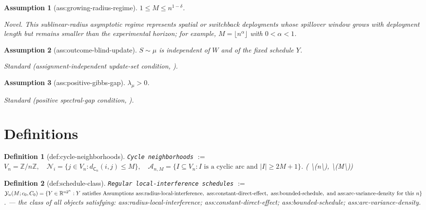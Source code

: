 \documentclass{article}
\newtheorem{assumption}{Assumption}
\newtheorem{definition}{Definition}
\begin{document}
\begin{assumption}[ass:growing-radius-regime]\label{ass:growing-radius-regime}
\(1\le M\le n^{1-\delta}\).
\par\smallskip\noindent\emph{Novel.} This sublinear-radius asymptotic regime represents spatial or switchback deployments whose spillover window grows with deployment length but remains smaller than the experimental horizon; for example, \(M=\lfloor n^\alpha\rfloor\) with \(0<\alpha<1\).
\end{assumption}

\begin{assumption}[ass:outcome-blind-update]\label{ass:outcome-blind-update}
\(S\sim\mu\) is independent of \(W\) and of the fixed schedule \(Y\).
\par\smallskip\noindent\emph{Standard} (assignment-independent update-set condition, \cite{ParkWager2026NeymanJackknife}).
\end{assumption}

\begin{assumption}[ass:positive-gibbs-gap]\label{ass:positive-gibbs-gap}
\(\lambda_\mu>0\).
\par\smallskip\noindent\emph{Standard} (positive spectral-gap condition, \cite{ParkWager2026NeymanJackknife}).
\end{assumption}

\section{Definitions}

\begin{definition}[def:cycle-neighborhoods]\label{def:cycle-neighborhoods}
\texttt{Cycle neighborhoods} $:=$ \(V_n=\mathbb Z/n\mathbb Z,\quad \mathcal N_i=\{j\in V_n:d_{\mathsf C_n}(i,j)\le M\},\quad \mathcal A_{n,M}=\{I\subseteq V_n:I\text{ is a cyclic arc and }|I|\ge2M+1\}\). \quad ( \textbackslash{}(n\textbackslash{}), \textbackslash{}(M\textbackslash{}))
\end{definition}

\begin{definition}[def:schedule-class]\label{def:schedule-class}
\texttt{Regular local-interference schedules} $:=$ \(\mathcal Y_n(M;c_0,C_0)=\{Y\in\mathbb R^{n2^n}:Y\text{ satisfies Assumptions }\textnormal{ass:radius-local-interference},\textnormal{ ass:constant-direct-effect},\textnormal{ ass:bounded-schedule},\textnormal{ and ass:arc-variance-density for this }n\}\). --- the class of all objects satisfying: ass:radius-local-interference; ass:constant-direct-effect; ass:bounded-schedule; ass:arc-variance-density.
\end{definition}
\end{document}
